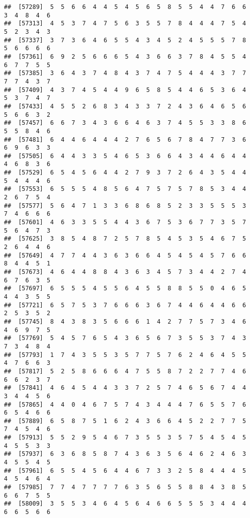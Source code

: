 \documentclass[
]{book}
\begin{document}
\begin{verbatim}
##  [57289]  5  5  6  6  4  4  5  4  5  6  5  8  5  5  4  4  7  6  6  3  4  8  4  6
##  [57313]  4  5  3  7  4  7  5  6  3  5  5  7  8  4  4  4  7  5  4  5  2  3  4  3
##  [57337]  3  7  3  6  4  6  5  5  4  3  4  5  2  4  5  5  5  7  8  5  6  6  6  6
##  [57361]  6  9  2  5  6  6  6  5  4  3  6  6  3  7  8  4  5  5  4  6  7  7  5  5
##  [57385]  3  6  4  3  7  4  8  4  3  7  4  7  5  4  4  4  3  7  7  7  7  4  3  7
##  [57409]  4  3  7  4  5  4  4  9  6  5  8  5  4  4  6  5  3  6  4  5  3  7  4  7
##  [57433]  4  5  5  2  6  8  3  4  3  3  7  2  4  3  6  4  6  5  6  5  6  6  3  2
##  [57457]  6  6  7  3  4  3  6  6  4  6  3  7  4  5  5  3  3  8  6  5  5  8  4  6
##  [57481]  6  4  4  6  4  4  4  2  7  6  5  6  7  8  4  7  7  3  6  6  9  6  3  3
##  [57505]  6  4  4  3  3  5  4  6  5  3  6  6  4  3  4  4  6  4  4  4  6  8  3  6
##  [57529]  6  5  4  5  6  4  4  2  7  9  3  7  2  6  4  3  5  4  4  5  4  4  4  6
##  [57553]  6  5  5  5  4  8  5  6  4  7  5  7  5  7  8  5  3  4  4  2  6  7  5  4
##  [57577]  5  6  4  7  1  3  3  6  8  6  8  5  2  3  3  5  5  5  3  7  4  6  6  6
##  [57601]  4  6  3  3  5  5  4  4  3  6  7  5  3  6  7  7  3  5  7  5  6  4  7  3
##  [57625]  3  8  5  4  8  7  2  5  7  8  5  4  5  3  5  4  6  7  5  2  6  4  4  6
##  [57649]  4  7  7  4  4  3  6  3  6  6  4  5  4  5  4  5  7  6  6  8  4  4  5  1
##  [57673]  4  6  4  4  8  8  4  3  6  3  4  5  7  3  4  4  2  7  4  6  7  6  3  5
##  [57697]  6  5  5  5  4  5  5  6  4  5  5  8  8  5  5  0  4  6  5  4  4  3  5  5
##  [57721]  6  5  7  5  3  7  6  6  6  3  6  7  4  4  6  4  4  6  6  2  5  3  5  2
##  [57745]  8  4  3  8  3  5  6  6  6  1  4  2  7  7  5  7  3  4  6  4  6  9  7  5
##  [57769]  5  4  5  7  6  5  4  3  6  5  6  7  3  5  5  3  7  4  3  7  3  4  8  4
##  [57793]  1  7  4  3  5  5  3  5  7  7  5  7  6  2  4  6  4  5  5  4  7  6  6  3
##  [57817]  5  2  5  8  6  6  6  4  7  5  5  8  7  2  2  7  7  4  6  6  6  2  3  7
##  [57841]  4  6  4  5  4  4  3  3  7  2  5  7  4  6  5  6  7  4  4  3  4  4  5  6
##  [57865]  4  4  0  4  6  7  5  7  4  3  4  4  4  7  6  5  5  7  6  6  5  4  6  6
##  [57889]  6  5  8  7  5  1  6  2  4  3  6  6  4  5  2  2  7  7  5  7  4  5  4  6
##  [57913]  5  5  2  9  5  4  6  7  3  5  5  3  5  7  5  4  5  4  5  4  5  5  3  3
##  [57937]  6  3  6  8  5  8  7  4  3  6  3  5  6  4  6  2  4  6  3  4  5  5  4  5
##  [57961]  6  5  5  4  5  6  4  4  6  7  3  3  2  5  8  4  4  4  5  4  5  4  6  4
##  [57985]  7  7  4  7  7  7  7  6  3  5  6  5  5  8  8  4  3  8  5  6  6  7  5  5
##  [58009]  3  5  5  3  4  6  4  5  6  4  6  6  5  5  5  3  4  4  4  6  6  5  6  6

\end{verbatim}
\end{document}
